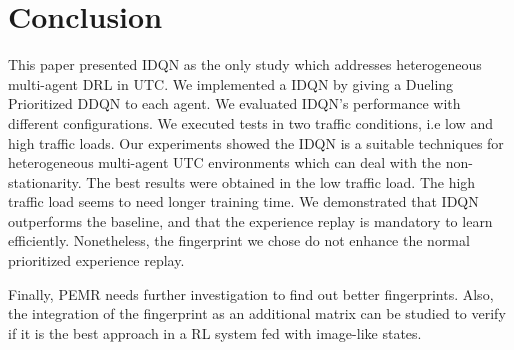 \documentclass{llncs}
\begin{document}

\section{Conclusion}

This paper presented IDQN as the only study which addresses heterogeneous multi-agent DRL in UTC. We implemented a IDQN by giving a Dueling Prioritized DDQN to each agent. We evaluated IDQN's performance with different configurations. We executed tests in two traffic conditions, i.e low and high traffic loads. Our experiments showed the IDQN is a suitable techniques for heterogeneous multi-agent UTC environments which can deal with the non-stationarity. The best results were obtained in the low traffic load. The high traffic load seems to need longer training time. We demonstrated that IDQN outperforms the baseline, and that the experience replay is mandatory to learn efficiently. Nonetheless, the fingerprint we chose do not enhance the normal prioritized experience replay.

Finally, PEMR needs further investigation to find out better fingerprints. Also, the integration of the fingerprint as an additional matrix can be studied to verify if it is the best approach in a RL system fed with image-like states.


 
\end{document}
